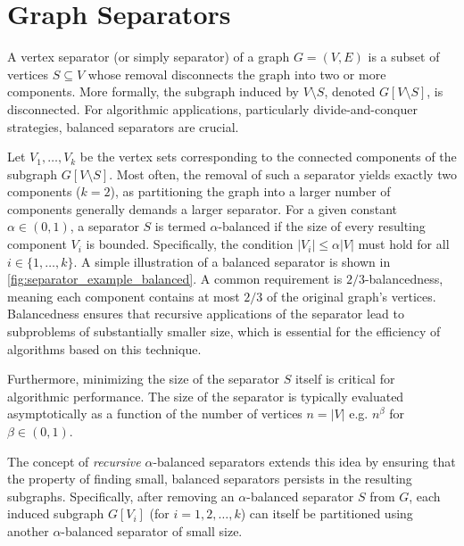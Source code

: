 \section{Graph Separators}
\label{sec:graphseparators}

A vertex separator (or simply separator) of a graph \(G = (V, E)\) is a subset of vertices \(S \subseteq V\) whose removal disconnects the graph into two or more components.
More formally, the subgraph induced by \(V \setminus S\), denoted \(G[V \setminus S]\), is disconnected.
For algorithmic applications, particularly divide-and-conquer strategies, balanced separators are crucial.

Let \(V_1, \dots, V_k\) be the vertex sets corresponding to the connected components of the subgraph \(G[V \setminus S]\).
Most often, the removal of such a separator yields exactly two components (\(k=2\)), as partitioning the graph into a larger number of components generally demands a larger separator.
For a given constant \(\alpha \in (0, 1)\), a separator \(S\) is termed \(\alpha\)-balanced if the size of every resulting component \(V_i\) is bounded.
Specifically, the condition \(|V_i| \leq \alpha |V|\) must hold for all \(i \in \{1, \dots, k\}\).
A simple illustration of a balanced separator is shown in \cref{fig:separator_example_balanced}.
A common requirement is \(2/3\)-balancedness, meaning each component contains at most \(2/3\) of the original graph's vertices.
Balancedness ensures that recursive applications of the separator lead to subproblems of substantially smaller size, which is essential for the efficiency of algorithms based on this technique.

Furthermore, minimizing the size of the separator \(S\) itself is critical for algorithmic performance.
The size of the separator is typically evaluated asymptotically as a function of the number of vertices \(n = |V|\) e.g. \(n^\beta\) for \(\beta \in (0,1)\).

The concept of \emph{recursive} \(\alpha\)-balanced separators extends this idea by ensuring that the property of finding small, balanced separators persists in the resulting subgraphs.
Specifically, after removing an \(\alpha\)-balanced separator \(S\) from \(G\), each induced subgraph \(G[V_i]\) (for \(i = 1, 2, \dots, k\)) can itself be partitioned using another \(\alpha\)-balanced separator of small size.

